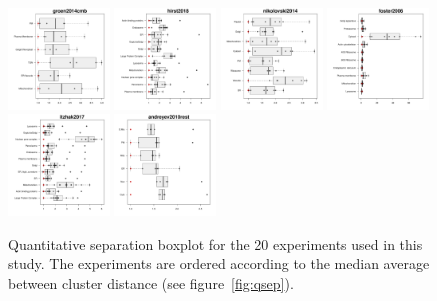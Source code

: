 \documentclass[12pt]{article}\usepackage[]{graphicx}\usepackage[]{color}
\begin{document}
\begin{figure}[p]
  \includegraphics[width = 0.24\textwidth]{./figure/allqseps-15.pdf}
  \includegraphics[width = 0.24\textwidth]{./figure/allqseps-16.pdf}
  \includegraphics[width = 0.24\textwidth]{./figure/allqseps-17.pdf}
  \includegraphics[width = 0.24\textwidth]{./figure/allqseps-18.pdf}
  \includegraphics[width = 0.24\textwidth]{./figure/allqseps-19.pdf}
  \includegraphics[width = 0.24\textwidth]{./figure/allqseps-20.pdf}
  \caption{Quantitative separation boxplot for the 20
    experiments used in this study. The experiments are ordered
    according to the median average between cluster distance (see
    figure~\ref{fig:qsep}). }
  \label{fig:allqseps}
\end{figure}
\end{document}
